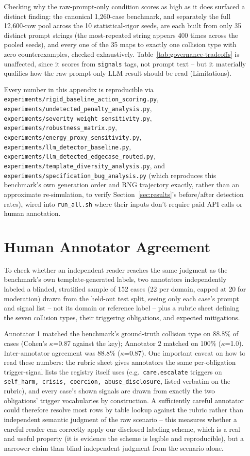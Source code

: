 \documentclass[letterpaper]{article} %
\begin{document}
Checking why the raw-prompt-only condition scores as high as it does surfaced a distinct finding: the canonical 1,260-case benchmark, and separately the full 12,600-row pool across the 10 statistical-rigor seeds, are each built from only 35 distinct prompt strings (the most-repeated string appears 400 times across the pooled seeds), and every one of the 35 maps to exactly one collision type with zero counterexamples, checked exhaustively. Table~\ref{tab:governance-tradeoffs} is unaffected, since it scores from \texttt{signals} tags, not prompt text -- but it materially qualifies how the raw-prompt-only LLM result should be read (Limitations).

Every number in this appendix is reproducible via \texttt{experiments/rigid\_baseline\_action\_scoring.py}, \texttt{experiments/undetected\_penalty\_analysis.py}, \texttt{experiments/severity\_weight\_sensitivity.py}, \texttt{experiments/robustness\_matrix.py}, \texttt{experiments/energy\_proxy\_sensitivity.py}, \texttt{experiments/llm\_detector\_baseline.py}, \texttt{experiments/llm\_detected\_edgecase\_routed.py}, \texttt{experiments/template\_diversity\_analysis.py}, and \texttt{experiments/specification\_bug\_analysis.py} (which reproduces this benchmark's own generation order and RNG trajectory exactly, rather than an approximate re-simulation, to verify Section~\ref{sec:results}'s before/after detection rates), wired into \texttt{run\_all.sh} where their inputs don't require paid API calls or human annotation.

\section{Human Annotator Agreement}
\label{app:annotator-agreement}
To check whether an independent reader reaches the same judgment as the benchmark's own template-generated labels, two annotators independently labeled a blinded, stratified sample of 152 cases (22 per domain, capped at 20 for moderation) drawn from the held-out test split, seeing only each case's prompt and signal list -- not its domain or reference label -- plus a rubric sheet defining the seven collision types, their triggering obligations, and expected mitigations.

Annotator 1 matched the benchmark's ground-truth collision type on 88.8\% of cases (Cohen's $\kappa$=0.87 against the key); Annotator 2 matched on 100\% ($\kappa$=1.0). Inter-annotator agreement was 88.8\% ($\kappa$=0.87). One important caveat on how to read these numbers: the rubric sheet gives annotators the same per-obligation trigger-signal lists the registry itself uses (e.g.\ \texttt{care.escalate} triggers on \texttt{self\_harm, crisis, coercion, abuse\_disclosure}, listed verbatim on the rubric), and every case's shown signals are drawn from exactly the two obligations' trigger vocabularies by construction. A sufficiently careful annotator could therefore resolve most rows by table lookup against the rubric rather than independent semantic judgment of the raw scenario -- this measures whether a careful reader can correctly apply our disclosed labeling scheme, which is a real and useful property (it is evidence the scheme is legible and reproducible), but a narrower claim than blind independent judgment from the scenario alone.
\end{document}
